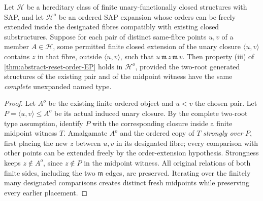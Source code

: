 \begin{lemma}
\label{lem:abstract-fresh-reset-midpoint}
Let $\mathcal H$ be a hereditary class of finite
unary-functionally closed structures with SAP,
and let $\mathcal H^o$ be an ordered SAP
expansion whose orders can be freely extended
inside the designated fibres compatibly
with existing closed substructures.
Suppose for each pair of distinct same-fibre
points $u,v$ of a member $A\in\mathcal H$,
some permitted finite closed extension of
the unary closure $\langle u,v\rangle$ contains
$z$ in that fibre, outside $\langle u,v\rangle$,
such that $u\,\mathfrak m\,z\,\mathfrak m\,v$.
Then property (iii) of
\cref{thm:abstract-reset-order-EP} holds in
$\mathcal H^o$, provided the two-root generated
structures of the existing pair and of the
midpoint witness have the same \emph{complete}
unexpanded named type.
\end{lemma}
\begin{proof}
Let $A^o$ be the existing finite ordered
object and $u<v$ the chosen pair.
Let $P=\langle u,v\rangle\le A^o$
be its actual induced unary closure.
By the complete two-root type assumption,
identify $P$ with the corresponding closure
inside a finite midpoint witness $T$.
Amalgamate $A^o$ and the ordered copy of $T$
\emph{strongly over} $P$, first placing the
new $z$ between $u,v$ in its designated
fibre; every comparison with other points
can be extended freely by the order-extension
hypothesis. Strongness keeps
$z\notin A^o$, since $z\notin P$ in the
midpoint witness. All original relations
of both finite sides, including the
two $\mathfrak m$ edges, are preserved.
Iterating over the finitely many designated
comparisons creates distinct fresh midpoints
while preserving every earlier placement.
\end{proof}

